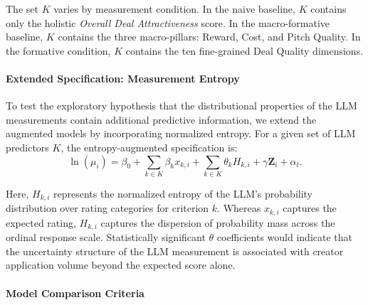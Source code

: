 The set $K$ varies by measurement condition. In the naive baseline, $K$ contains only the holistic \textit{Overall Deal Attractiveness} score. In the macro-formative baseline, $K$ contains the three macro-pillars: Reward, Cost, and Pitch Quality. In the formative condition, $K$ contains the ten fine-grained Deal Quality dimensions. 



\paragraph{Extended Specification: Measurement Entropy}
To test the exploratory hypothesis that the distributional properties of the LLM measurements contain additional predictive information, we extend the augmented models by incorporating normalized entropy. For a given set of LLM predictors $K$, the entropy-augmented specification is:
\begin{equation}\label{eq:barter_extended_regression}
    \ln(\mu_i) = \beta_0 + \sum_{k \in K} \beta_k x_{k,i} + \sum_{k \in K} \theta_k H_{k,i} + \gamma \mathbf{Z}_i + \alpha_t.
\end{equation}

Here, $H_{k,i}$ represents the normalized entropy of the LLM's probability distribution over rating categories for criterion $k$. Whereas $x_{k,i}$ captures the expected rating, $H_{k,i}$ captures the dispersion of probability mass across the ordinal response scale. Statistically significant $\theta$ coefficients would indicate that the uncertainty structure of the LLM measurement is associated with creator application volume beyond the expected score alone.




\paragraph{Model Comparison Criteria}

